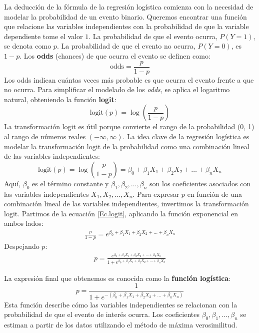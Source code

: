\documentclass[a4paper]{report} %
\begin{document}
La deducción de la fórmula de la regresión logística comienza con la necesidad de modelar la probabilidad de un evento binario. Queremos encontrar una función que relacione las variables independientes con la probabilidad de que la variable dependiente tome el valor $1$. La probabilidad de que el evento ocurra, $P(Y=1)$, se denota como $p$. La probabilidad de que el evento no ocurra, $P(Y=0)$, es $1-p$. Los \textbf{odds} (chances) de que ocurra el evento se definen como:
\begin{equation}
\text{odds} = \frac{p}{1-p}
\end{equation}
Los odds indican cuántas veces más probable es que ocurra el evento frente a que no ocurra. Para simplificar el modelado de los \textit{odds}, se aplica el logaritmo natural, obteniendo la función \textbf{logit}:
\begin{equation}
\text{logit}(p) = \log\left(\frac{p}{1-p}\right)
\end{equation}
La transformación logit es útil porque convierte el rango de la probabilidad (0, 1) al rango de números reales $\left(-\infty, \infty\right)$. La idea clave de la regresión logística es modelar la transformación logit de la probabilidad como una combinación lineal de las variables independientes:
\begin{equation}\label{Ec.logit}
\text{logit}(p) = \log\left(\frac{p}{1-p}\right) = \beta_0 + \beta_1 X_1 + \beta_2 X_2 + \ldots + \beta_n X_n
\end{equation}
Aquí, $\beta_0$ es el t\'ermino constante y $\beta_1, \beta_2, \ldots, \beta_n$ son los coeficientes asociados con las variables independientes $X_1, X_2, \ldots, X_n$. Para expresar $p$ en función de una combinación lineal de las variables independientes, invertimos la transformación logit. Partimos de la ecuación \ref{Ec.logit}, aplicando la funci\'on exponencial en ambos lados:
\begin{eqnarray}
\frac{p}{1-p} = e^{\beta_0 + \beta_1 X_1 + \beta_2 X_2 + \ldots + \beta_n X_n}
\end{eqnarray}
Despejando $p$:
\begin{eqnarray}
p = \frac{e^{\beta_0 + \beta_1 X_1 + \beta_2 X_2 + \ldots + \beta_n X_n}}{1 + e^{\beta_0 + \beta_1 X_1 + \beta_2 X_2 + \ldots + \beta_n X_n}}
\end{eqnarray}

La expresión final que obtenemos es conocida como la \textbf{función logística}:
\begin{equation}\label{Eq.Logit1}
p = \frac{1}{1 + e^{-\left(\beta_0 + \beta_1 X_1 + \beta_2 X_2 + \ldots + \beta_n X_n\right)}}
\end{equation}
Esta función describe cómo las variables independientes se relacionan con la probabilidad de que el evento de interés ocurra. Los coeficientes $\beta_0, \beta_1, \ldots, \beta_n$ se estiman a partir de los datos utilizando el método de máxima verosimilitud.
\end{document}
